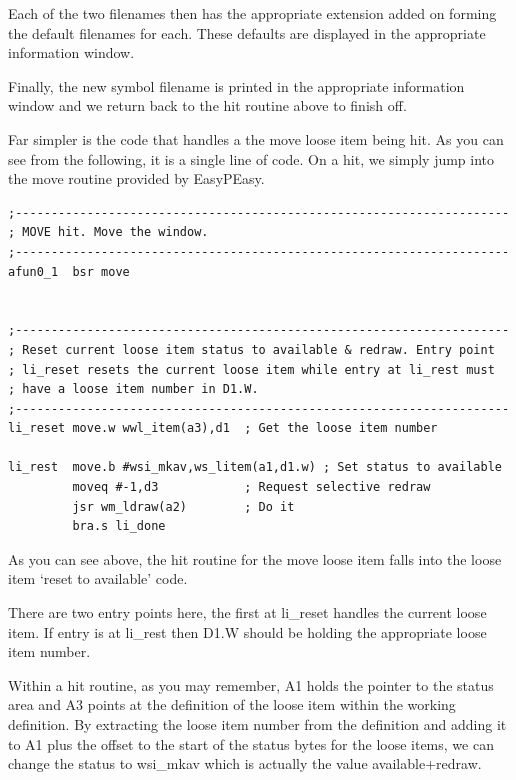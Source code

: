 Each of the two filenames then has the appropriate extension added
    on forming the default filenames for each. These defaults are displayed in
    the appropriate information window.

Finally, the new symbol filename is printed in the appropriate
    information window and we return back to the hit routine above to finish
    off.

Far simpler is the code that handles a the move loose item being
    hit. As you can see from the following, it is a single line of code. On a
    hit, we simply jump into the move routine provided by
 EasyPEasy.

\begin{lstlisting}[firstnumber=last,caption={LibGen\_asm - Move Action \& Loose Item Reset Routines}]
;---------------------------------------------------------------------
; MOVE hit. Move the window.
;---------------------------------------------------------------------
afun0_1  bsr move


;---------------------------------------------------------------------
; Reset current loose item status to available & redraw. Entry point
; li_reset resets the current loose item while entry at li_rest must
; have a loose item number in D1.W.
;---------------------------------------------------------------------
li_reset move.w wwl_item(a3),d1  ; Get the loose item number

li_rest  move.b #wsi_mkav,ws_litem(a1,d1.w) ; Set status to available
         moveq #-1,d3            ; Request selective redraw
         jsr wm_ldraw(a2)        ; Do it
         bra.s li_done
\end{lstlisting}

As you can see above, the hit routine for the move loose item falls
    into the loose item `reset to available' code.

There are two entry points here, the first at
 li\_reset handles the current loose item. If entry is
    at li\_rest then D1.W should be holding the
    appropriate loose item number.

Within a hit routine, as you may remember, A1 holds the pointer to
    the status area and A3 points at the definition of the loose item within
    the working definition. By extracting the loose item number from the
    definition and adding it to A1 plus the offset to the start of the status
    bytes for the loose items, we can change the status to
 wsi\_mkav which is actually the value available+redraw.

